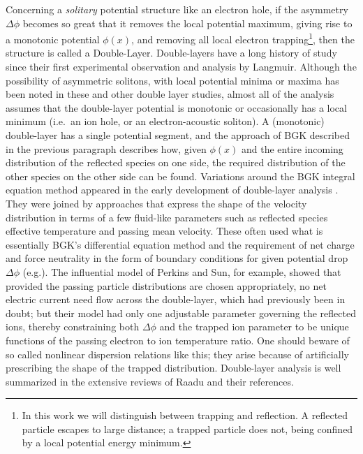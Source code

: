 \documentclass[pre]{revtex4-2}
\begin{document}
Concerning a \emph{solitary} potential structure like an electron
hole, if the asymmetry $\Delta \phi$ becomes so great that it removes
the local potential maximum, giving rise to a monotonic potential
$\phi(x)$, and removing all local electron trapping\footnote{In this
  work we will distinguish between trapping and reflection. A
  reflected particle escapes to large distance; a trapped particle
  does not, being confined by a local potential energy minimum.}, then
the structure is called a Double-Layer.  Double-layers have a long
history of study since their first experimental observation and
analysis by Langmuir\cite{Langmuir1929}. Although the possibility of
asymmetric solitons, with local potential minima or maxima has been
noted in these and other double layer studies\cite{Schamel1986},
almost all of the analysis assumes that the double-layer potential is
monotonic or occasionally has a local minimum (i.e.\ an ion hole, or
an electron-acoustic soliton\cite{Vasko2017a}).  A (monotonic)
double-layer has a single potential segment, and the approach of BGK
described in the previous paragraph describes how, given $\phi(x)$ and
the entire incoming distribution of the reflected species on one side,
the required distribution of the other species on the other side can
be found. Variations around the BGK integral equation method appeared
in the early development of double-layer analysis
\cite{Montgomery1969,Knorr1974}. They were joined by approaches that
express the shape of the velocity distribution in terms of a few
fluid-like parameters such as reflected species effective temperature
and passing mean velocity. These often used what is essentially BGK's
differential equation method and the requirement of net charge and
force neutrality in the form of boundary conditions for given
potential drop $\Delta \phi$ (e.g.\cite{Schamel1983}). The influential
model of Perkins and Sun\cite{Perkins1981}, for example, showed that
provided the passing particle distributions are chosen appropriately,
no net electric current need flow across the double-layer, which had
previously been in doubt; but their model had only one adjustable
parameter governing the reflected ions, thereby constraining both
$\Delta \phi$ and the trapped ion parameter to be unique functions of
the passing electron to ion temperature ratio. One should beware of so
called nonlinear dispersion relations like this; they arise because of
artificially prescribing the shape of the trapped distribution.
Double-layer analysis is well summarized in the extensive reviews of
Raadu\cite{Raadu1989,Raadu1988} and their references.
\end{document}

